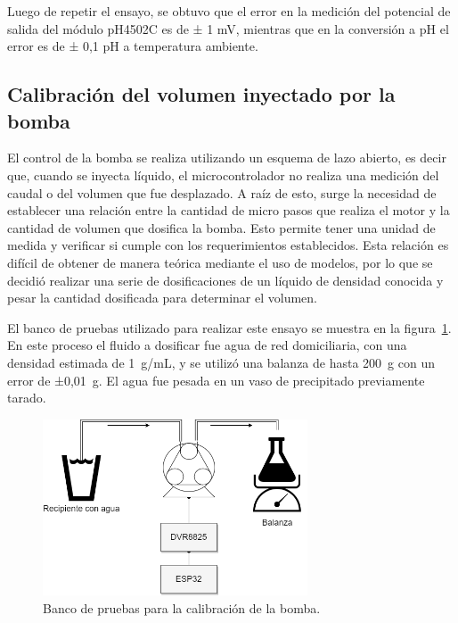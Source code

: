 Luego de repetir el ensayo, se obtuvo que el error en la medición del potencial de salida del módulo pH4502C es de ± 1 mV, mientras que en la conversión a pH el error es de ± 0,1 pH a temperatura ambiente. 

\subsection{Calibración del volumen inyectado por la bomba}

El control de la bomba se realiza utilizando un esquema de lazo abierto, es decir que, cuando se inyecta líquido, el microcontrolador  no realiza una medición del caudal o del volumen que fue desplazado. A raíz de esto, surge la necesidad de establecer una relación entre la cantidad de micro pasos que realiza el motor y la cantidad de volumen que dosifica la bomba. Esto permite tener una unidad de medida y verificar si cumple con los requerimientos establecidos. Esta relación es difícil de obtener de manera teórica mediante el uso de modelos, por lo que se decidió realizar una serie de dosificaciones de un líquido de densidad conocida y pesar la cantidad dosificada para determinar el volumen.

El banco de pruebas utilizado para realizar este ensayo se muestra en la figura~\ref{fig:bancoPruebasBomba}. En este proceso el fluido a dosificar fue agua de red domiciliaria, con una densidad estimada de 1~g/mL, y se utilizó una balanza de hasta 200~g con un error de ±0,01~g. El agua fue pesada en un vaso de precipitado previamente tarado.

\vspace{1,5 cm}

\begin{figure}[htbp]
	\centering
	\includegraphics[width=0.7\textwidth]{./Figures/bancoPruebasBomba.png}
	\caption{Banco de pruebas para la calibración de la bomba.}
	\label{fig:bancoPruebasBomba}
\end{figure}

